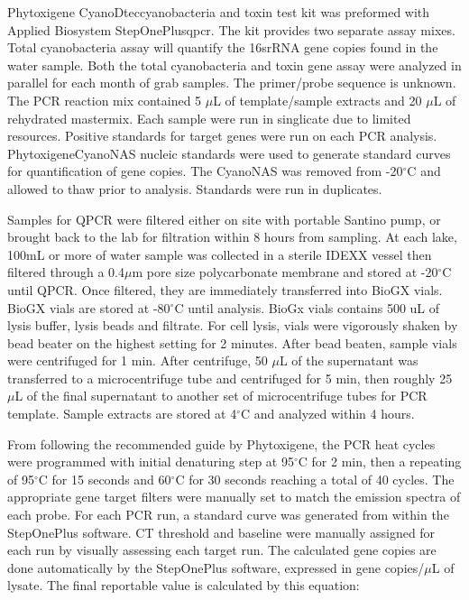 Phytoxigene CyanoDtec\texttrademark cyanobacteria and toxin test kit was preformed with Applied Biosystem StepOnePlus\texttrademark \gls{qpcr}. The kit provides two separate assay mixes. Total cyanobacteria assay will quantify the 16srRNA gene copies found in the water sample. Both the total cyanobacteria and toxin gene assay  were analyzed in parallel for each month of grab samples. The primer/probe sequence is unknown.  The PCR reaction mix contained 5 $\mu$L of template/sample extracts and 20 $\mu$L of rehydrated mastermix.  Each sample were run in singlicate due to limited resources. Positive standards for target genes  were run on each PCR analysis. Phytoxigene\texttrademark CyanoNAS nucleic standards were used to generate standard curves for quantification of gene copies. The CyanoNAS was removed from -20$^\circ$C and allowed to thaw prior to analysis.  Standards were run in duplicates.

Samples for QPCR were filtered either on site with portable Santino pump, or brought back to the lab for filtration within 8 hours from sampling.
At each lake, 100mL or more of water sample was collected in a sterile IDEXX vessel then filtered through a 0.4$\mu$m pore size polycarbonate membrane  and stored at -20$^\circ$C until QPCR. Once filtered, they are immediately transferred into BioGX vials. BioGX vials are stored at -80$^\circ$C until analysis. BioGx vials contains 500 uL of lysis buffer, lysis beads and filtrate. For cell lysis, vials were vigorously shaken by bead beater on the highest setting for 2 minutes. After bead beaten, sample vials were centrifuged for 1 min. After centrifuge, 50 $\mu$L of the supernatant was transferred to a microcentrifuge tube and centrifuged for 5 min, then roughly 25 $\mu$L of the final supernatant to another set of microcentrifuge tubes for PCR template.  Sample extracts are stored at 4$^\circ$C and analyzed within 4 hours.

From following the recommended guide by Phytoxigene, the PCR heat cycles were programmed with initial denaturing step at 95$^\circ$C for 2 min, then a repeating of 95$^\circ$C for 15 seconds and 60$^\circ$C for 30 seconds reaching a total of 40 cycles. The appropriate gene target filters were manually set to match the emission spectra of each probe.  For each PCR run, a standard curve was generated  from within the StepOnePlus software. CT threshold and baseline were manually assigned for each run by visually assessing each target run. The calculated gene copies are done automatically by the StepOnePlus software, expressed in gene copies/$\mu$L of lysate. The final reportable value is calculated by this equation:

